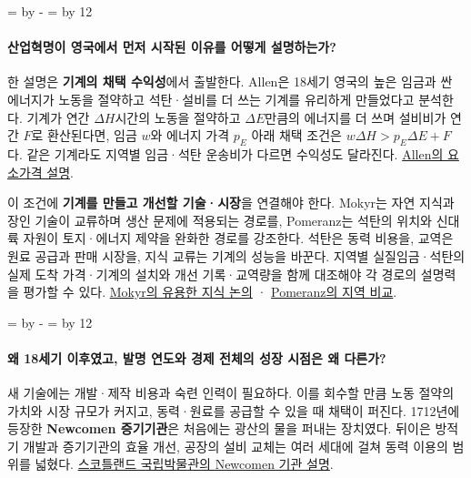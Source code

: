 \documentclass[10pt,a4paper]{article}
\newcommand{\ReserveQuestionSpace}{%
  \par\begingroup
  \dimen0=\pagegoal \advance\dimen0 by -\pagetotal
  \dimen2=\baselineskip \multiply\dimen2 by 12
  \ifdim\dimen0<\dimen2 \newpage\fi
  \endgroup}
\begin{document}
\ReserveQuestionSpace
\paragraph{산업혁명이 영국에서 먼저 시작된 이유를 어떻게 설명하는가?}

한 설명은 \textbf{기계의 채택 수익성}에서 출발한다. Allen은 18세기 영국의 높은 임금과 싼 에너지가 노동을 절약하고 석탄·설비를 더 쓰는 기계를 유리하게 만들었다고 분석한다. 기계가 연간 $\Delta H$시간의 노동을 절약하고 $\Delta E$만큼의 에너지를 더 쓰며 설비비가 연간 $F$로 환산된다면, 임금 $w$와 에너지 가격 $p_E$ 아래 채택 조건은 $w\Delta H>p_E\Delta E+F$다. 같은 기계라도 지역별 임금·석탄 운송비가 다르면 수익성도 달라진다. \href{https://onlinelibrary.wiley.com/doi/10.1111/j.1468-0289.2010.00532.x}{Allen의 요소가격 설명}.\par

이 조건에 \textbf{기계를 만들고 개선할 기술·시장}을 연결해야 한다. Mokyr는 자연 지식과 장인 기술이 교류하며 생산 문제에 적용되는 경로를, Pomeranz는 석탄의 위치와 신대륙 자원이 토지·에너지 제약을 완화한 경로를 강조한다. 석탄은 동력 비용을, 교역은 원료 공급과 판매 시장을, 지식 교류는 기계의 성능을 바꾼다. 지역별 실질임금·석탄의 실제 도착 가격·기계의 설치와 개선 기록·교역량을 함께 대조해야 각 경로의 설명력을 평가할 수 있다. \href{https://www.cambridge.org/core/journals/journal-of-economic-history/article/abs/intellectual-origins-of-modern-economic-growth/138F07525A5105E29E7113705D393C51}{Mokyr의 유용한 지식 논의} · \href{https://www.jstor.org/stable/j.ctv161f3dr}{Pomeranz의 지역 비교}.\par

\ReserveQuestionSpace
\paragraph{왜 18세기 이후였고, 발명 연도와 경제 전체의 성장 시점은 왜 다른가?}

새 기술에는 개발·제작 비용과 숙련 인력이 필요하다. 이를 회수할 만큼 노동 절약의 가치와 시장 규모가 커지고, 동력·원료를 공급할 수 있을 때 채택이 퍼진다. 1712년에 등장한 \textbf{Newcomen 증기기관}은 처음에는 광산의 물을 퍼내는 장치였다. 뒤이은 방적기 개발과 증기기관의 효율 개선, 공장의 설비 교체는 여러 세대에 걸쳐 동력 이용의 범위를 넓혔다. \href{https://www.nms.ac.uk/discover-catalogue/the-newcomen-engine-and-its-role-in-britains-industrial-revolution}{스코틀랜드 국립박물관의 Newcomen 기관 설명}.\par
\end{document}
